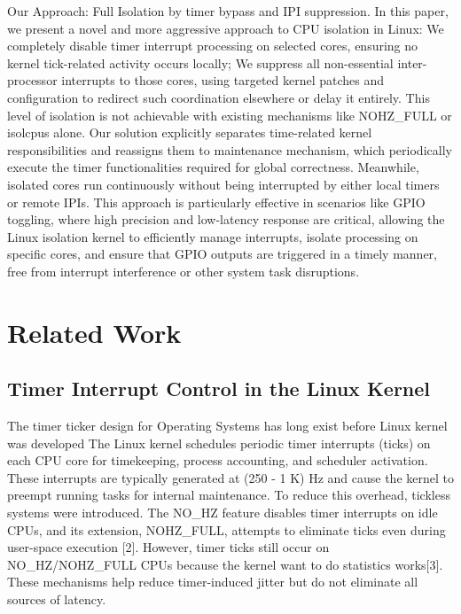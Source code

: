 \documentclass[letterpaper]{article}
\begin{document}
Our Approach: Full Isolation by timer bypass and IPI suppression. In this paper, we present a novel
and more aggressive approach to CPU isolation in Linux: We completely disable timer interrupt
processing on selected cores, ensuring no kernel tick-related activity occurs locally; We suppress
all non-essential inter-processor interrupts to those cores, using targeted kernel patches and
configuration to redirect such coordination elsewhere or delay it entirely. This level of isolation is
not achievable with existing mechanisms like NOHZ\_FULL or isolcpus alone. Our solution explicitly
separates time-related kernel responsibilities and reassigns them to maintenance mechanism,
which periodically execute the timer functionalities required for global correctness. Meanwhile,
isolated cores run continuously without being interrupted by either local timers or remote IPIs.
This approach is particularly effective in scenarios like GPIO toggling, where high precision and
low-latency response are critical, allowing the Linux isolation kernel to efficiently manage interrupts,
isolate processing on specific cores, and ensure that GPIO outputs are triggered in a timely manner,
free from interrupt interference or other system task disruptions.


\section{Related Work}\label{BG} 
\subsection{Timer Interrupt Control in the Linux Kernel}
The timer ticker design for Operating Systems has long exist before Linux kernel was
developed
The Linux kernel schedules periodic timer interrupts (ticks) on each CPU core for timekeeping,
process accounting, and scheduler activation. These interrupts are typically generated at (250 - 1
K) Hz and cause the kernel to preempt running tasks for internal maintenance.
To reduce this overhead, tickless systems were introduced. The NO\_HZ feature disables timer
interrupts on idle CPUs, and its extension, NOHZ\_FULL, attempts to eliminate ticks even during
user-space execution [2]. However, timer ticks still occur on NO\_HZ/NOHZ\_FULL CPUs because the
kernel want to do statistics works[3].
These mechanisms help reduce timer-induced jitter but do not eliminate all sources of latency.
\end{document}
